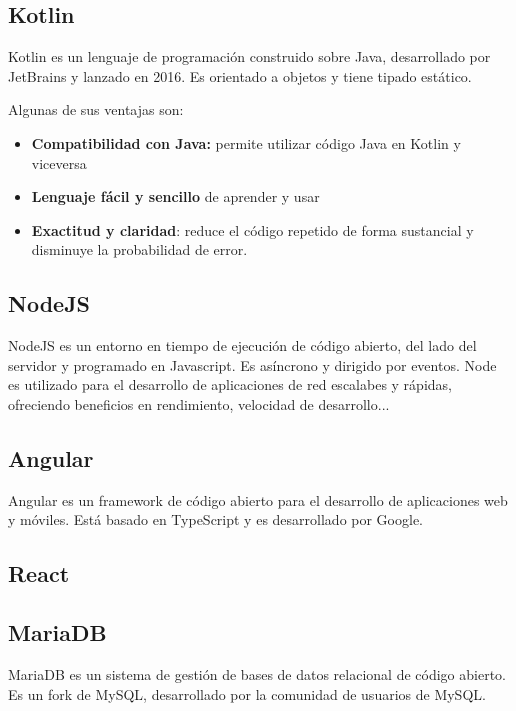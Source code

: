 \subsection{Kotlin}
Kotlin es un lenguaje de programación construido sobre Java, desarrollado por JetBrains y lanzado en 2016.
Es orientado a objetos y tiene tipado estático. 

Algunas de sus ventajas son:
\begin{itemize}
    \item \textbf{Compatibilidad con Java:} permite utilizar código Java en Kotlin y viceversa
    \item \textbf{Lenguaje fácil y sencillo} de aprender y usar
    \item \textbf{Exactitud y claridad}: reduce el código repetido de forma sustancial y disminuye la probabilidad de error.

\end{itemize}


\subsection{NodeJS}
NodeJS es un entorno en tiempo de ejecución de código abierto, del lado del servidor y programado en Javascript. 
Es asíncrono y dirigido por eventos. Node es utilizado para el desarrollo de aplicaciones de red escalabes y rápidas, ofreciendo beneficios
en rendimiento, velocidad de desarrollo...
\subsection{Angular}
Angular es un framework de código abierto para el desarrollo de aplicaciones web y móviles. Está basado en TypeScript y es desarrollado por Google.

\subsection{React}
\subsection{MariaDB}
MariaDB es un sistema de gestión de bases de datos relacional de código abierto. Es un fork de MySQL, desarrollado por la comunidad de usuarios de MySQL.


